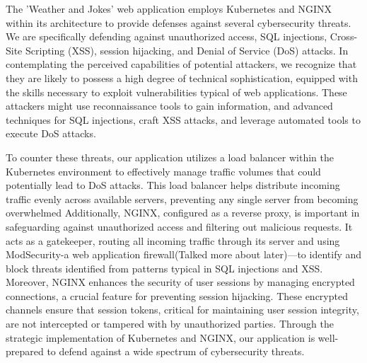 The 'Weather and Jokes' web application employs Kubernetes and NGINX within its architecture to provide defenses against several cybersecurity threats. 
We are specifically defending against unauthorized access, SQL injections, Cross-Site Scripting (XSS), session hijacking, and Denial of Service (DoS) attacks. 
In contemplating the perceived capabilities of potential attackers, we recognize that they are likely to possess a high degree of technical sophistication, equipped with the skills necessary to exploit vulnerabilities typical of web applications. 
These attackers might use reconnaissance tools to gain information, and advanced techniques for SQL injections, craft XSS attacks, and leverage automated tools to execute DoS attacks.

To counter these threats, our application utilizes a load balancer within the Kubernetes environment to effectively manage traffic volumes that could potentially lead to DoS attacks. 
This load balancer helps distribute incoming traffic evenly across available servers, preventing any single server from becoming overwhelmed
Additionally, NGINX, configured as a reverse proxy, is important in safeguarding against unauthorized access and filtering out malicious requests. It acts as a gatekeeper, routing all incoming traffic through its server and using ModSecurity-a web application firewall(Talked more about later)—to identify and block threats identified from patterns typical in SQL injections and XSS. 
Moreover, NGINX enhances the security of user sessions by managing encrypted connections, a crucial feature for preventing session hijacking. 
These encrypted channels ensure that session tokens, critical for maintaining user session integrity, are not intercepted or tampered with by unauthorized parties.
Through the strategic implementation of Kubernetes and NGINX, our application is well-prepared to defend against a wide spectrum of cybersecurity threats.
